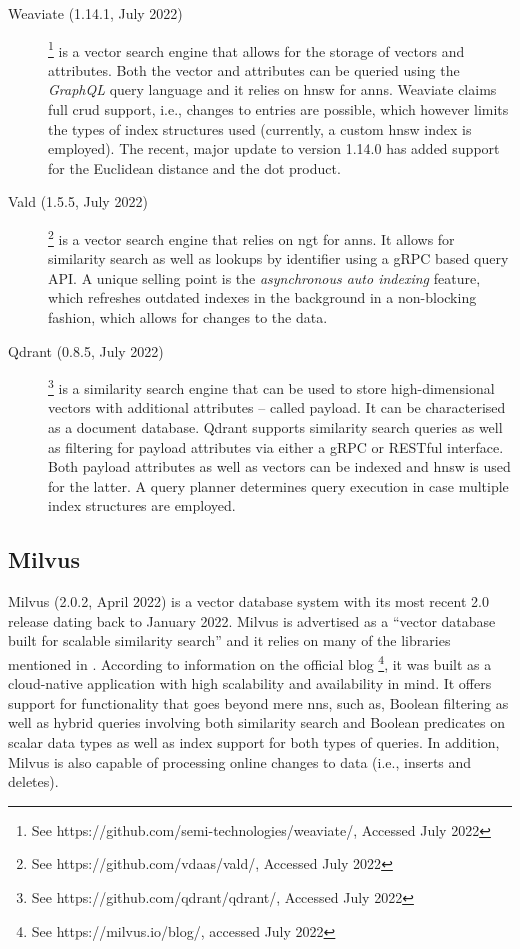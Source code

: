 \begin{description}
    \item[Weaviate (1.14.1, July 2022)] \footnote{See https://github.com/semi-technologies/weaviate/, Accessed July 2022} is a vector search engine that allows for the storage of vectors and attributes. Both the vector and attributes can be queried using the \emph{GraphQL} query language and it relies on \acrshort{hnsw} \cite{Malkov:2018Efficient} for \acrshort{anns}. Weaviate claims full \acrshort{crud} support, i.e., changes to entries are possible, which however limits the types of index structures used (currently, a custom \acrshort{hnsw} index is employed). The recent, major update to version 1.14.0 has added support for the Euclidean distance and the dot product.
    \item[Vald (1.5.5, July 2022)] \footnote{See https://github.com/vdaas/vald/, Accessed July 2022} is a vector search engine that relies on \acrshort{ngt} for \acrshort{anns}. It allows for similarity search as well as lookups by identifier using a gRPC based query API. A unique selling point is the \emph{asynchronous auto indexing} feature, which refreshes outdated indexes in the background in a non-blocking fashion, which allows for changes to the data.
    \item[Qdrant (0.8.5, July 2022)] \footnote{See https://github.com/qdrant/qdrant/, Accessed July 2022} is a similarity search engine that can be used to store high-dimensional vectors with additional attributes -- called payload. It can be characterised as a document database. Qdrant supports similarity search queries as well as filtering for payload attributes via either a gRPC or RESTful interface. Both payload attributes as well as vectors can be indexed and \acrshort{hnsw} \cite{Malkov:2018Efficient} is used for the latter. A query planner determines query execution in case multiple index structures are employed.
\end{description}

\subsection{Milvus}
\label{section:milvus}

Milvus (2.0.2, April 2022) \cite{Wang:2021Milvus} is a vector database system with its most recent 2.0 release dating back to January 2022. Milvus is advertised as a ``vector database built for scalable similarity search'' and it relies on many of the libraries mentioned in . According to information on the official blog \footnote{See https://milvus.io/blog/, accessed July 2022}, it was built as a cloud-native application with high scalability and availability in mind. It offers support for functionality that goes beyond mere \acrshort{nns}, such as, Boolean filtering as well as hybrid queries involving both similarity search and Boolean predicates on scalar data types as well as index support for both types of queries. In addition, Milvus is also capable of processing online changes to data (i.e., inserts and deletes).

